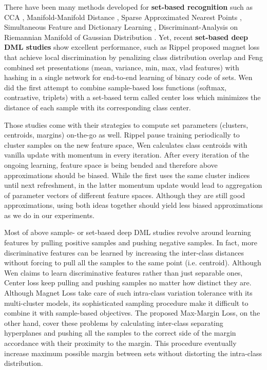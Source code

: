 \documentclass[10pt,twocolumn,letterpaper]{article}
\newcommand{\note}[1]{}%
\newcommand{\margin}{Max-Margin Loss\xspace}
\begin{document}
There have been many methods developed for \textbf{set-based recognition} such as CCA \cite{kim2007discriminative} , Manifold-Manifold Distance \cite{wang2008manifold}, Sparse Approximated Nearest Points \cite{hu2012face}, Simultaneous Feature and Dictionary Learning \cite{lu2014simultaneous}, Discriminant-Analysis on Riemannian Manifold of Gaussian Distribution \cite{wang2015discriminant}. Yet, recent \textbf{set-based deep DML studies} show excellent performance, such as Rippel \etal\cite{rippel2015metric} proposed magnet loss that achieve local discrimination by penalizing class distribution overlap and Feng \etal \cite{feng2016deep} combined set presentations (mean, variance, min, max, vlad features) with hashing in a single network for end-to-end learning of binary code of sets. Wen \etal \cite{wen2016discriminative} did the first attempt to combine sample-based loss functions (\eg softmax, contrastive, triplets) with a set-based term called center loss which minimizes the distance of each sample with its corresponding class center. \note{there is a mix in the previous work. you talk about set-based terms, then traditional CCA and then back to deep learning}

Those studies come with their strategies to compute set parameters (\eg clusters, centroids, margins) on-the-go as well. Rippel \etal\cite{rippel2015metric} pause training periodically to cluster samples on the new feature space, Wen \etal \cite{wen2016discriminative} calculates class centroids with vanilla update with momentum in every iteration. After every iteration of the ongoing learning, feature space is being bended and therefore above approximations should be biased. While the first uses the same cluster indices until next refreshment, in the latter momentum update would lead to aggregation of parameter vectors of different feature spaces. Although they are still good approximations, using both ideas together should yield less biased approximations as we do in our experiments.


Most of above sample- or set-based deep DML studies revolve around learning features by pulling positive samples and pushing negative samples. In fact, more discriminative features can be learned by increasing the inter-class distances without forcing to pull all the samples to the same point (i.e. centroid). Although Wen \etal \cite{wen2016discriminative} claims to learn discriminative features rather than just separable ones, Center loss keep pulling and pushing samples no matter how distinct they are. Although Magnet Loss take care of such intra-class variation tolerance with its multi-cluster models, its sophisticated sampling procedure make it difficult to combine it with sample-based objectives. The proposed \margin, on the other hand, cover these problems by calculating inter-class separating hyperplanes and pushing all the samples to the correct side of the margin accordance with their proximity to the margin. This procedure eventually increase maximum possible margin between sets without distorting the intra-class distribution.
\end{document}
